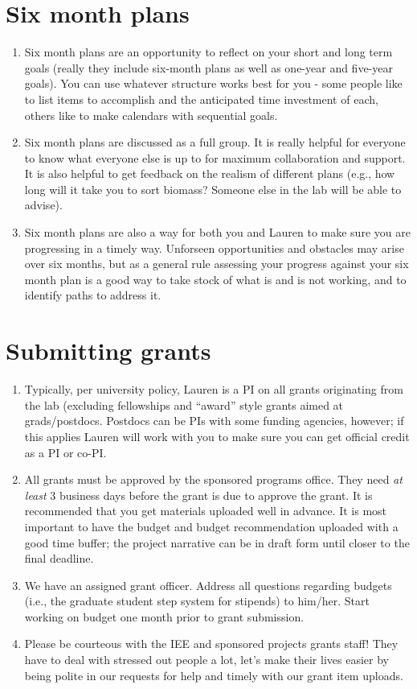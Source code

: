 \documentclass[12pt]{article}
\begin{document}
\section{Six month plans}
\begin{enumerate}
\item Six month plans are an opportunity to reflect on your short and long term goals (really they include six-month plans as well as one-year and five-year goals). You can use whatever structure works best for you - some people like to list items to accomplish and the anticipated time investment of each, others like to make calendars with sequential goals. 
\item Six month plans are discussed as a full group. It is really helpful for everyone to know what everyone else is up to for maximum collaboration and support. It is also helpful to get feedback on the realism of different plans (e.g., how long will it take you to sort biomass? Someone else in the lab will be able to advise). 
\item Six month plans are also a way for both you and Lauren to make sure you are progressing in a timely way. Unforseen opportunities and obstacles may arise over six months, but as a general rule assessing your progress against your six month plan is a good way to take stock of what is and is not working, and to identify paths to address it.
\end{enumerate}


\section{Submitting grants}
\begin{enumerate}
\item Typically, per university policy, Lauren is a PI on all grants originating from
  the lab (excluding fellowships and ``award'' style grants aimed at grads/postdocs. Postdocs can be PIs with some funding agencies, however; if this applies Lauren will work with you to make sure you can get official credit as a PI or co-PI.
\item All grants must be approved by the sponsored programs office. They need \textit{at least} 3 business days before the grant is due to approve the grant. It is recommended that you get materials uploaded well in advance. It is most important to have the budget and budget recommendation uploaded with a good time buffer; the project narrative can be in draft form until closer to the final deadline.  
\item We have an assigned grant officer.  Address all questions regarding budgets (i.e., the graduate student step system for stipends) to him/her. Start working on budget one month prior to grant submission.
\item Please be courteous with the IEE and sponsored projects grants staff! They have to deal with stressed out people a lot, let's make their lives easier by being polite in our requests for help and timely with our grant item uploads.
\end{enumerate}
\end{document}

